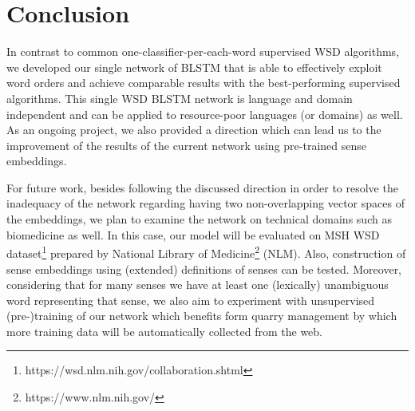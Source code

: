 \documentclass{llncs}
\begin{document}
\section{Conclusion}
In contrast to common one-classifier-per-each-word supervised WSD algorithms, we developed our single network of BLSTM that is able to effectively exploit word orders and achieve comparable results with the best-performing supervised algorithms. This single WSD BLSTM network is language and domain independent and can be applied to resource-poor languages (or domains) as well. As an ongoing project, we also provided a direction which can lead us to the improvement of the results of the current network using pre-trained sense embeddings.

For future work, besides following the discussed direction in order to resolve the inadequacy of the network regarding having two non-overlapping vector spaces of the embeddings, we plan to examine the network on technical domains such as biomedicine as well. In this case, our model will be evaluated on MSH WSD dataset\footnote{https://wsd.nlm.nih.gov/collaboration.shtml} prepared by National Library of Medicine\footnote{https://www.nlm.nih.gov/} (NLM). Also, construction of sense embeddings using (extended) definitions of senses \cite{pesaranghader2015simdef}\cite{pesaranghader2013adapting} can be tested. Moreover, considering that for many senses we have at least one (lexically) unambiguous word representing that sense, we also aim to experiment with unsupervised (pre-)training of our network which benefits form quarry management by which more training data will be automatically collected from the web.

                  
\end{document}
